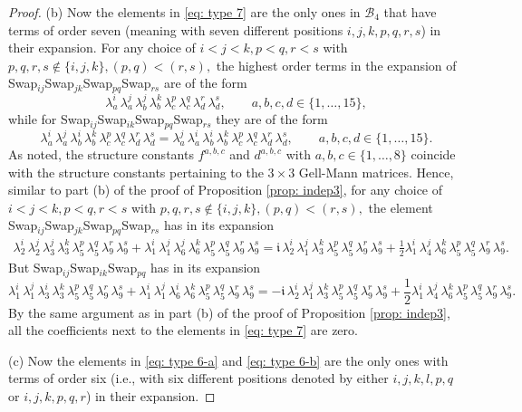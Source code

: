 \documentclass[10pt,a4paper]{amsart}
\begin{document}
\begin{proof}
	(b) Now the elements in \eqref{eq: type 7} are the only ones in $\mathcal{B}_4$ that have terms of order seven (meaning with seven different positions $i,j,k,p,q,r,s$) in their expansion. For any choice of  $i < j < k, p<q, r<s$ with $p,q,r,s \notin \{i,j,k\}, (p,q)<(r,s),$ the highest order terms in the expansion of Swap$_{ij}$Swap$_{jk}$Swap$_{pq}$Swap$_{rs}$ are of the form
	$$
	\lambda_a^i\, \lambda_a^j\, \lambda_b^j\, \lambda_b^k\, \lambda_c^p\, \lambda_c^q\, \lambda_d^r\, \lambda_d^s, 
	\quad \quad a,b,c,d \in \{1,\ldots,15\},
	$$
	while for Swap$_{ij}$Swap$_{ik}$Swap$_{pq}$Swap$_{rs}$ they are of the form
	$$
	\lambda_a^i\, \lambda_a^j\, \lambda_b^i\, \lambda_b^k\, \lambda_c^p\, \lambda_c^q\, \lambda_d^r\, \lambda_d^s = \lambda_a^j\,\lambda_a^i\,  \lambda_b^i\, \lambda_b^k\, \lambda_c^p\, \lambda_c^q\, \lambda_d^r\, \lambda_d^s ,
	\quad \quad a,b,c,d \in \{1,\ldots,15\}.
	$$
	As noted, the structure constants $f^{a,b,c}$ and $d^{a,b,c}$ with $a,b,c\in\{1,\ldots,8\}$ coincide with the structure constants pertaining to the $3 \times 3$ Gell-Mann matrices.
	Hence, similar to part (b) of the proof of Proposition \ref{prop: indep3}, for any choice of $i < j < k, p<q, r<s$ with $p,q,r,s \notin \{i,j,k\}, (p,q)<(r,s),$  the element Swap$_{ij}$Swap$_{jk}$Swap$_{pq}$Swap$_{rs}$ has in its expansion
	\begin{align*}
		\lambda_2^i\, \lambda_2^j\, \lambda_3^j\, \lambda_3^k\, \lambda_5^p\, \lambda_5^q\, \lambda_9^r\, \lambda_9^s + \lambda_1^i\, \lambda_1^j\, \lambda_6^j\, \lambda_6^k\, \lambda_5^p\, \lambda_5^q\, \lambda_9^r\, \lambda_9^s =
		\mathfrak{i}\,\lambda_2^i\, \lambda_1^j\, \lambda_3^k\, \lambda_5^p\, \lambda_5^q\, \lambda_9^r\, \lambda_9^s + \frac{1}{2} \lambda_1^i\, \lambda_4^j\, \lambda_6^k\, \lambda_5^p\, \lambda_5^q\, \lambda_9^r\, \lambda_9^s.
	\end{align*}
	But Swap$_{ij}$Swap$_{ik}$Swap$_{pq}$ has in its expansion
	$$
	\lambda_1^i\, \lambda_1^j\, \lambda_3^i\, \lambda_3^k\, \lambda_5^p\, \lambda_5^q\, \lambda_9^r\, \lambda_9^s + \lambda_1^i\, \lambda_1^j\, \lambda_6^i\, \lambda_6^k\, \lambda_5^p\, \lambda_5^q\, \lambda_9^r\, \lambda_9^s =
	-\mathfrak{i}\,\lambda_2^i\, \lambda_1^j\, \lambda_3^k\, \lambda_5^p\, \lambda_5^q\, \lambda_9^r\, \lambda_9^s + \frac{1}{2} \lambda_1^i\, \lambda_4^j\, \lambda_6^k\, \lambda_5^p\, \lambda_5^q\, \lambda_9^r\, \lambda_9^s.
	$$
	By the same argument as in part (b) of the proof of Proposition \ref{prop: indep3}, all the coefficients next to the elements in \eqref{eq: type 7} are zero.
	
	(c) Now the elements in \eqref{eq: type 6-a} and \eqref{eq: type 6-b} are the only ones with terms of order six (i.e., with six different positions denoted by either $i,j,k,l,p,q$ or $i,j,k,p,q,r$) in their expansion.
	

\end{proof}
\end{document}
